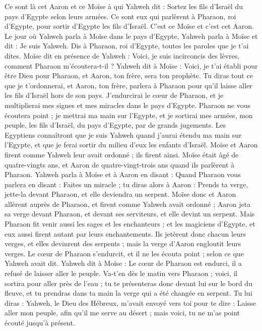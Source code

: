 \begin{multicols}{2}
Ce sont là cet Aaron et ce Moïse à qui Yahweh dit : Sortez les fils d'Israël du pays d'Egypte selon leurs armées.
Ce sont eux qui parlèrent à Pharaon, roi d'Egypte, pour sortir d'Egypte les fils d'Israël. C'est ce Moïse et c'est cet Aaron.
Le jour où Yahweh parla à Moïse dans le pays d'Egypte,
Yahweh parla à Moïse et dit : Je suis Yahweh. Dis à Pharaon, roi d'Egypte, toutes les paroles que je t'ai dites.
Moïse dit en présence de Yahweh : Voici, je suis incirconcis des lèvres, comment Pharaon m'écoutera-t-il ?
\VerseOne{}Yahweh dit à Moïse : Voici, je t'ai établi pour être Dieu pour Pharaon, et Aaron, ton frère, sera ton prophète.
Tu diras tout ce que je t’ordonnerai, et Aaron, ton frère, parlera à Pharaon pour qu'il laisse aller les fils d'Israël hors de son pays.
J'endurcirai le cœur de Pharaon, et je multiplierai mes signes et mes miracles dans le pays d'Egypte.
Pharaon ne vous écoutera point ; je mettrai ma main sur l'Egypte, et je sortirai mes armées, mon peuple, les fils d'Israël, du pays d'Egypte, par de grands jugements.
Les Egyptiens connaîtront\FTNT{} que je suis Yahweh quand j'aurai étendu ma main sur l'Egypte, et que je ferai sortir du milieu d'eux les enfants d'Israël.
Moïse et Aaron firent comme Yahweh leur avait ordonné ; ils firent ainsi.
Moïse était âgé de quatre-vingts ans, et Aaron de quatre-vingt-trois ans quand ils parlèrent à Pharaon.
Yahweh parla à Moïse et à Aaron en disant :
Quand Pharaon vous parlera en disant : Faites un miracle ; tu diras alors à Aaron : Prends ta verge, jette-la devant Pharaon, et elle deviendra un serpent.
Moïse donc et Aaron allèrent auprès de Pharaon, et firent comme Yahweh avait ordonné ; Aaron jeta sa verge devant Pharaon, et devant ses serviteurs, et elle devint un serpent.
Mais Pharaon fit venir aussi les sages et les enchanteurs ; et les magiciens d'Egypte, et eux aussi firent autant par leurs enchantements.
Ils jetèrent donc chacun leurs verges, et elles devinrent des serpents ; mais la verge d'Aaron engloutit leurs verges.
Le cœur de Pharaon s'endurcit, et il ne les écouta point ; selon ce que Yahweh avait dit.
Yahweh dit à Moïse : Le cœur de Pharaon est endurci, il a refusé de laisser aller le peuple.
Va-t'en dès le matin vers Pharaon ; voici, il sortira pour aller près de l'eau ; tu te présenteras donc devant lui sur le bord du fleuve, et tu prendras dans ta main la verge qui a été changée en serpent.
Tu lui diras : Yahweh, le Dieu des Hébreux, m'avait envoyé vers toi pour te dire : Laisse aller mon peuple, afin qu'il me serve au désert ; mais voici, tu ne m'as point écouté jusqu’à présent.

\end{multicols}
